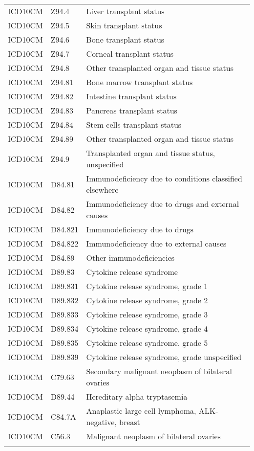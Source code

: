 \begin{longtable}{p{}p{}p{}}
  ICD10CM & Z94.4 & Liver transplant status \\ 
  ICD10CM & Z94.5 & Skin transplant status \\ 
  ICD10CM & Z94.6 & Bone transplant status \\ 
  ICD10CM & Z94.7 & Corneal transplant status \\ 
  ICD10CM & Z94.8 & Other transplanted organ and tissue status \\ 
  ICD10CM & Z94.81 & Bone marrow transplant status \\ 
  ICD10CM & Z94.82 & Intestine transplant status \\ 
  ICD10CM & Z94.83 & Pancreas transplant status \\ 
  ICD10CM & Z94.84 & Stem cells transplant status \\ 
  ICD10CM & Z94.89 & Other transplanted organ and tissue status \\ 
  ICD10CM & Z94.9 & Transplanted organ and tissue status, unspecified \\ 
  ICD10CM & D84.81 & Immunodeficiency due to conditions classified elsewhere \\ 
  ICD10CM & D84.82 & Immunodeficiency due to drugs and external causes \\ 
  ICD10CM & D84.821 & Immunodeficiency due to drugs \\ 
  ICD10CM & D84.822 & Immunodeficiency due to external causes \\ 
  ICD10CM & D84.89 & Other immunodeficiencies \\ 
  ICD10CM & D89.83 & Cytokine release syndrome \\ 
  ICD10CM & D89.831 & Cytokine release syndrome, grade 1 \\ 
  ICD10CM & D89.832 & Cytokine release syndrome, grade 2 \\ 
  ICD10CM & D89.833 & Cytokine release syndrome, grade 3 \\ 
  ICD10CM & D89.834 & Cytokine release syndrome, grade 4 \\ 
  ICD10CM & D89.835 & Cytokine release syndrome, grade 5 \\ 
  ICD10CM & D89.839 & Cytokine release syndrome, grade unspecified \\ 
  ICD10CM & C79.63 & Secondary malignant neoplasm of bilateral ovaries \\ 
  ICD10CM & D89.44 & Hereditary alpha tryptasemia \\ 
  ICD10CM & C84.7A & Anaplastic large cell lymphoma, ALK-negative, breast \\ 
  ICD10CM & C56.3 & Malignant neoplasm of bilateral ovaries \\ 
  \hline
\label{tab:codes_immunocompromised}
\end{longtable}
